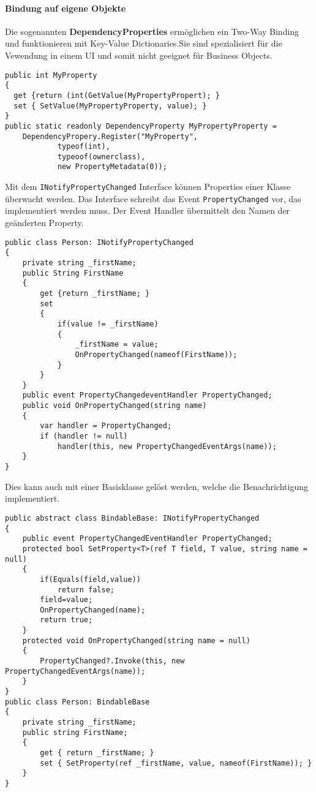 \paragraph{Bindung auf eigene Objekte} Die sogenannten \textbf{DependencyProperties} ermöglichen ein Two-Way Binding und funktionieren mit Key-Value Dictionaries.Sie sind spezialisiert für die Vewendung in einem UI und somit nicht geeignet für Business Objects.
\begin{lstlisting}
public int MyProperty
{
  get {return (int(GetValue(MyPropertyPropert); }
  set { SetValue(MyPropertyProperty, value); }
}
public static readonly DependencyProperty MyPropertyProperty = 
    DependencyPropery.Register("MyProperty", 
            typeof(int), 
            typeoof(ownerclass), 
            new PropertyMetadata(0));
\end{lstlisting}
Mit dem \verb+INotifyPropertyChanged+ Interface können Properties einer Klasse überwacht werden. Das Interface schreibt das Event \verb+PropertyChanged+ vor, das implementiert werden muss. Der Event Handler übermittelt den Namen der geänderten Property.
\begin{lstlisting}
public class Person: INotifyPropertyChanged
{
    private string _firstName;
    public String FirstName
    {
        get {return _firstName; }
        set
        {
            if(value != _firstName)
            {
                _firstName = value;
                OnPropertyChanged(nameof(FirstName));
            }
        }
    }
    public event PropertyChangedeventHandler PropertyChanged;
    public void OnPropertyChanged(string name)
    {
        var handler = PropertyChanged;
        if (handler != null)
            handler(this, new PropertyChangedEventArgs(name));
    }
}
\end{lstlisting}
Dies kann auch mit einer Basisklasse gelöst werden, welche die Benachrichtigung implementiert.
\begin{lstlisting}
public abstract class BindableBase: INotifyPropertyChanged
{
    public event PropertyChangedEventHandler PropertyChanged;
    protected bool SetProperty<T>(ref T field, T value, string name = null)
    {
        if(Equals(field,value))
            return false;
        field=value;
        OnPropertyChanged(name);
        return true;
    }
    protected void OnPropertyChanged(string name = null)
    {
        PropertyChanged?.Invoke(this, new PropertyChangedEventArgs(name));
    }
}
public class Person: BindableBase
{
    private string _firstName;
    public string FirstName;
    {
        get { return _firstName; }
        set { SetProperty(ref _firstName, value, nameof(FirstName)); }
    }
}
\end{lstlisting}
